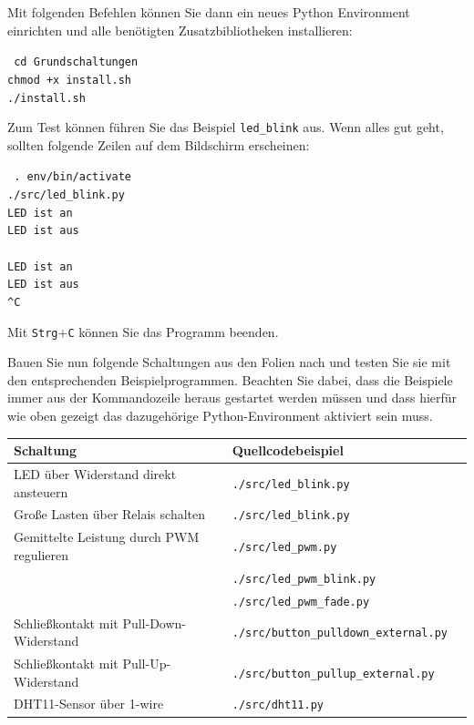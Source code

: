 Mit folgenden Befehlen können Sie dann ein neues Python Environment einrichten
und alle benötigten Zusatzbibliotheken installieren:

{
    \medskip
    \tt
    \CommandPrompt{\~{}\$} cd Grundschaltungen \\
     chmod +x install.sh \\
     ./install.sh
    \medskip
}

Zum Test können führen Sie das Beispiel \texttt{led\_blink} aus. Wenn alles gut
geht, sollten folgende Zeilen auf dem Bildschirm erscheinen:

{
    \medskip
    \tt
     . env/bin/activate \\
     ./src/led\_blink.py \\
    LED ist an \\
    LED ist aus \\
    \\
    LED ist an \\
    LED ist aus \\
    \^{}C
    \medskip
}

Mit \texttt{Strg}+\texttt{C} können Sie das Programm beenden.

\bigskip
\teilaufgabe
Bauen Sie nun folgende Schaltungen aus den Folien nach und testen Sie sie mit
den entsprechenden Beispielprogrammen. Beachten Sie dabei, dass die Beispiele
immer aus der Kommandozeile heraus gestartet werden müssen und dass hierfür
wie oben gezeigt das dazugehörige Python-Environment aktiviert sein muss.

\bigskip

\begin{tabularx}{\textwidth}{|X|X|X|}
    \hline
    \textbf{Schaltung} & \textbf{Quellcodebeispiel} \\

    \hline
    LED über Widerstand direkt ansteuern &
    \verb|./src/led_blink.py| \\

    \hline
    Große Lasten über Relais schalten &
    \verb|./src/led_blink.py| \\

    \hline
    Gemittelte Leistung durch PWM regulieren &
    \verb|./src/led_pwm.py| \\
    &
    \verb|./src/led_pwm_blink.py| \\
    &
    \verb|./src/led_pwm_fade.py| \\

    \hline
    Schließkontakt mit Pull-Down-Widerstand &
    \verb|./src/button_pulldown_external.py| \\

    \hline
    Schließkontakt mit Pull-Up-Widerstand &
    \verb|./src/button_pullup_external.py| \\

    \hline
    DHT11-Sensor über 1-wire &
    \verb|./src/dht11.py| \\

    \hline
\end{tabularx}


